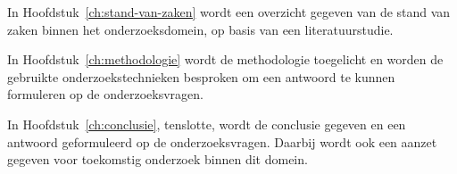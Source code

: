 In Hoofdstuk~\ref{ch:stand-van-zaken} wordt een overzicht gegeven van de stand van zaken binnen het onderzoeksdomein, op basis van een literatuurstudie.

In Hoofdstuk~\ref{ch:methodologie} wordt de methodologie toegelicht en worden de gebruikte onderzoekstechnieken besproken om een antwoord te kunnen formuleren op de onderzoeksvragen.


In Hoofdstuk~\ref{ch:conclusie}, tenslotte, wordt de conclusie gegeven en een antwoord geformuleerd op de onderzoeksvragen. Daarbij wordt ook een aanzet gegeven voor toekomstig onderzoek binnen dit domein.